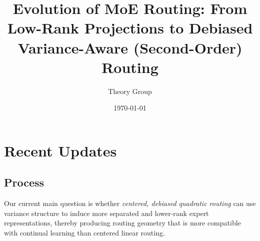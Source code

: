 \documentclass[11pt]{article}
\title{Evolution of MoE Routing: From Low-Rank Projections to Debiased Variance-Aware (Second-Order) Routing}
\author{Theory Group}
\date{\today}
\newcommand{\idea}[1]{\textcolor{red}{[#1]}}
\begin{document}
\maketitle

% 

\section{Recent Updates}



\subsection{Process}

Our current main question is whether \emph{centered, debiased quadratic routing} can use variance structure to induce more separated and lower-rank expert representations, thereby producing routing geometry that is more compatible with continual learning than centered linear routing.
\end{document}
